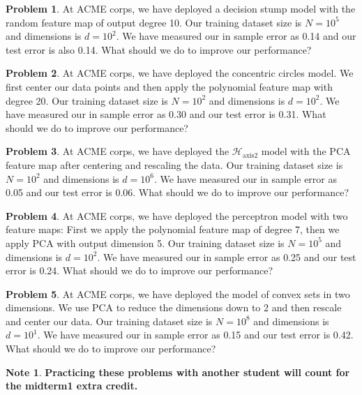 \documentclass[10pt]{exam}
\theoremstyle{definition}
\newtheorem{problem}{Problem}
\newtheorem{note}{Note}
\newcommand{\HH}[1]{\mathcal H_{\text{#1}}}
\begin{document}
\begin{problem}
At ACME corps, we have deployed a decision stump model with the random feature map of output degree 10.
Our training dataset size is $N=10^5$ and dimensions is $d=10^2$.
We have measured our in sample error as 0.14 and our test error is also 0.14.
What should we do to improve our performance?
\end{problem}

\begin{problem}
At ACME corps, we have deployed the concentric circles model.
We first center our data points and then apply the polynomial feature map with degree 20.
Our training dataset size is $N=10^2$ and dimensions is $d=10^2$.
We have measured our in sample error as 0.30 and our test error is 0.31.
What should we do to improve our performance?
\end{problem}

\begin{problem}
At ACME corps, we have deployed the $\HH{axis2}$ model with the PCA feature map after centering and rescaling the data.
Our training dataset size is $N=10^2$ and dimensions is $d=10^6$.
We have measured our in sample error as 0.05 and our test error is 0.06.
What should we do to improve our performance?
\end{problem}

\begin{problem}
At ACME corps, we have deployed the perceptron model with two feature maps: First we apply the polynomial feature map of degree 7, then we apply PCA with output dimension 5.
Our training dataset size is $N=10^5$ and dimensions is $d=10^2$.
We have measured our in sample error as 0.25 and our test error is 0.24.
What should we do to improve our performance?
\end{problem}

\begin{problem}
At ACME corps, we have deployed the model of convex sets in two dimensions.  We use PCA to reduce the dimensions down to 2 and then rescale and center our data.
Our training dataset size is $N=10^8$ and dimensions is $d=10^1$.
We have measured our in sample error as 0.15 and our test error is 0.42.
What should we do to improve our performance?
\end{problem}


\begin{note}
    \textbf{Practicing these problems with another student will count for the midterm1 extra credit.}
\end{note}
\end{document}
